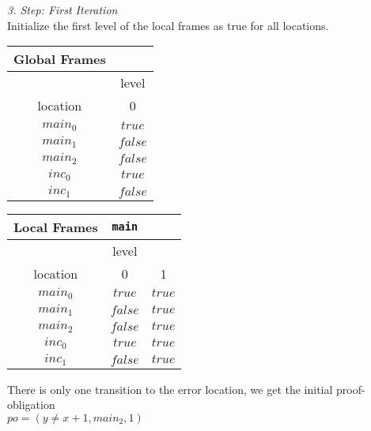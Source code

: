 \documentclass{article}
\begin{document}
	\vspace*{1em}
	\textsl{3. Step: First Iteration} \\
	Initialize the first level of the local frames as true for all locations. \\
	\begin{minipage}{.5\textwidth}
	\setlength\tabcolsep{0.35em}
	\begin{center}
		\begin{tabu}{cc}
			Global Frames \\
			\toprule
			& level \\
			\cmidrule(lr){2-2}
			location & 0 \\
			$main_0$ & $true$ \\
			$main_1$ & $false$ \\
			$main_2$ & $false$ \\
			$inc_0$ & $true$ \\
			$inc_1$ & $false$\\
			\bottomrule
		\end{tabu}
	\end{center}
	\end{minipage}
	\hfill
	\begin{minipage}{.4\textwidth}
		\setlength\tabcolsep{0.35em}
		\begin{center}
			\begin{tabu}{ccc}
				Local Frames & \texttt{main}\\
				\toprule
				& level \\
				\cmidrule(lr){2-2}
				location & 0 & 1 \\
				\cmidrule{1-3}
				$main_0$ & $true$ & $true$ \\
				$main_1$ & $false$ & $true$\\
				$main_2$ & $false$ & $true$\\
				$inc_0$ & $true$ & $true$\\
				$inc_1$ & $false$ & $true$\\
				\bottomrule
			\end{tabu}
		\end{center}	
	\end{minipage}
	
	\vspace*{1em}

	There is only one transition to the error location, we get the initial proof-obligation \\ $po = (y \neq x + 1, main_2, 1)$  \\ \\
	
\end{document}
